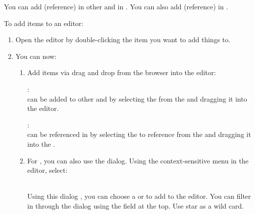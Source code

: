 
You can add (reference) \gdcases{} in other \gdcases{} and in \gdsuites{}. You can also add (reference) \gdsuites{} in \gdjobs{}. 

To add items to an editor:

\begin{enumerate}
\item Open the editor by double-clicking the item you want to add things to.
\item You can now:
\begin{enumerate}
\item Add items via drag and drop from the browser into the editor:

\textbf{\gdcases}:\\
\gdcases{} can be added to other \gdcases{} and \gdsuites{} by selecting the \gdcase{} from the \gdtestcasebrowser{} and dragging it into the editor. 

\textbf{\gdsuites}:\\
\gdsuites{} can be referenced in \gdjobs{} by selecting the \gdsuite{} to reference from the \gdtestsuitebrowser{} and dragging it into the \gdjobeditor{}.



\item For \gdcases{}, you can also use the  dialog. Using the context-sensitive menu in the editor, select:\\

\\


Using this dialog , you can choose a \gdcase{} or \gdcases{} to add to the editor. You can filter in through the dialog using the field at the top. Use star \bxshell{*} as a wild card.


\end{enumerate}
\end{enumerate}
